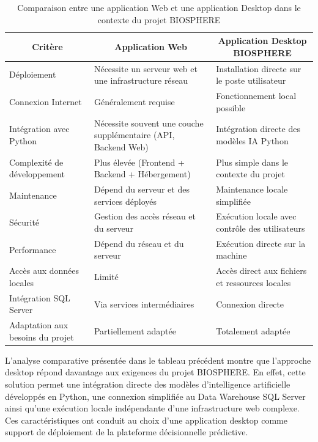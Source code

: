 \begin{table}[H]
\centering
\caption{Comparaison entre une application Web et une application Desktop dans le contexte du projet BIOSPHERE}
\label{tab:ch5:web_vs_desktop}
\small
\begin{tabular}{|p{3.5cm}|p{5cm}|p{5.5cm}|}
\hline
\multicolumn{1}{|c|}{\textbf{Critère}} & \multicolumn{1}{c|}{\textbf{Application Web}} & \multicolumn{1}{c|}{\textbf{Application Desktop BIOSPHERE}} \\
\hline
Déploiement & Nécessite un serveur web et une infrastructure réseau & Installation directe sur le poste utilisateur \\
\hline
Connexion Internet & Généralement requise & Fonctionnement local possible \\
\hline
Intégration avec Python & Nécessite souvent une couche supplémentaire (API, Backend Web) & Intégration directe des modèles IA Python \\
\hline
Complexité de développement & Plus élevée (Frontend + Backend + Hébergement) & Plus simple dans le contexte du projet \\
\hline
Maintenance & Dépend du serveur et des services déployés & Maintenance locale simplifiée \\
\hline
Sécurité & Gestion des accès réseau et du serveur & Exécution locale avec contrôle des utilisateurs \\
\hline
Performance & Dépend du réseau et du serveur & Exécution directe sur la machine \\
\hline
Accès aux données locales & Limité & Accès direct aux fichiers et ressources locales \\
\hline
Intégration SQL Server & Via services intermédiaires & Connexion directe \\
\hline
Adaptation aux besoins du projet & Partiellement adaptée & Totalement adaptée \\
\hline
\end{tabular}
\end{table}

L'analyse comparative présentée dans le tableau précédent montre que l'approche desktop répond davantage aux exigences du projet BIOSPHERE. En effet, cette solution permet une intégration directe des modèles d'intelligence artificielle développés en Python, une connexion simplifiée au Data Warehouse SQL Server ainsi qu'une exécution locale indépendante d'une infrastructure web complexe. Ces caractéristiques ont conduit au choix d'une application desktop comme support de déploiement de la plateforme décisionnelle prédictive.

